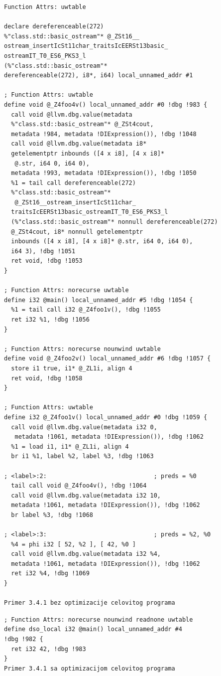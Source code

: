 \documentclass[12pt,oneside]{memoir}
\begin{document}
\begin{lstlisting}[frame=single]
 Function Attrs: uwtable

declare dereferenceable(272) 
%"class.std::basic_ostream"* @_ZSt16__
ostream_insertIcSt11char_traitsIcEERSt13basic_
ostreamIT_T0_ES6_PKS3_l
(%"class.std::basic_ostream"* 
dereferenceable(272), i8*, i64) local_unnamed_addr #1

; Function Attrs: uwtable
define void @_Z4foo4v() local_unnamed_addr #0 !dbg !983 {
  call void @llvm.dbg.value(metadata 
  %"class.std::basic_ostream"* @_ZSt4cout, 
  metadata !984, metadata !DIExpression()), !dbg !1048
  call void @llvm.dbg.value(metadata i8* 
  getelementptr inbounds ([4 x i8], [4 x i8]*
   @.str, i64 0, i64 0), 
  metadata !993, metadata !DIExpression()), !dbg !1050
  %1 = tail call dereferenceable(272) 
  %"class.std::basic_ostream"*
   @_ZSt16__ostream_insertIcSt11char_
  traitsIcEERSt13basic_ostreamIT_T0_ES6_PKS3_l
  (%"class.std::basic_ostream"* nonnull dereferenceable(272) 
  @_ZSt4cout, i8* nonnull getelementptr 
  inbounds ([4 x i8], [4 x i8]* @.str, i64 0, i64 0), 
  i64 3), !dbg !1051
  ret void, !dbg !1053
}

; Function Attrs: norecurse uwtable
define i32 @main() local_unnamed_addr #5 !dbg !1054 {
  %1 = tail call i32 @_Z4foo1v(), !dbg !1055
  ret i32 %1, !dbg !1056
}

; Function Attrs: norecurse nounwind uwtable
define void @_Z4foo2v() local_unnamed_addr #6 !dbg !1057 {
  store i1 true, i1* @_ZL1i, align 4
  ret void, !dbg !1058
}

; Function Attrs: uwtable
define i32 @_Z4foo1v() local_unnamed_addr #0 !dbg !1059 {
  call void @llvm.dbg.value(metadata i32 0,
   metadata !1061, metadata !DIExpression()), !dbg !1062
  %1 = load i1, i1* @_ZL1i, align 4
  br i1 %1, label %2, label %3, !dbg !1063

; <label>:2:                              ; preds = %0
  tail call void @_Z4foo4v(), !dbg !1064
  call void @llvm.dbg.value(metadata i32 10, 
  metadata !1061, metadata !DIExpression()), !dbg !1062
  br label %3, !dbg !1068

; <label>:3:                              ; preds = %2, %0
  %4 = phi i32 [ 52, %2 ], [ 42, %0 ]
  call void @llvm.dbg.value(metadata i32 %4, 
  metadata !1061, metadata !DIExpression()), !dbg !1062
  ret i32 %4, !dbg !1069
}

Primer 3.4.1 bez optimizacije celovitog programa
\end{lstlisting}


\begin{lstlisting}[frame=single]
; Function Attrs: norecurse nounwind readnone uwtable
define dso_local i32 @main() local_unnamed_addr #4 
!dbg !982 {
  ret i32 42, !dbg !983
}
Primer 3.4.1 sa optimizacijom celovitog programa
\end{lstlisting}
\end{document}
